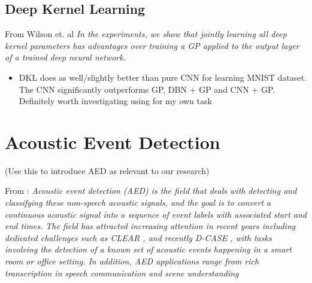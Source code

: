 \documentclass[12pt]{llncs}
\begin{document}
\subsection{Deep Kernel Learning}

From Wilson et. al \cite{wilson2016deep}
\emph{In the experiments, we show that jointly learning all deep kernel parameters has advantages over training a GP applied to the output layer of a trained deep neural network.}

\begin{itemize}
	\item DKL does as well/slightly better than pure CNN for learning MNIST dataset. The CNN significantly outperforms GP, DBN + GP and CNN + GP. Definitely worth investigating using for my own task
\end{itemize}


\section{Acoustic Event Detection}
\label{sec:AED}
(Use this to introduce AED as relevant to our research)

From \cite{espi2015exploiting}:
\emph{Acoustic event detection (AED) is the field that deals
with detecting and classifying these non-speech acoustic
signals, and the goal is to convert a continuous acoustic
signal into a sequence of event labels with associated
start and end times. The field has attracted increasing
attention in recent years including dedicated challenges
such as CLEAR \cite{mostefa2007chil}, and recently D-CASE \cite{giannoulis2013detection}, with tasks
involving the detection of a known set of acoustic events
happening in a smart room or office setting. In addition,
AED applications range from rich transcription in
speech communication \cite{mostefa2007chil,giannoulis2013detection} and scene understanding}
\end{document}
